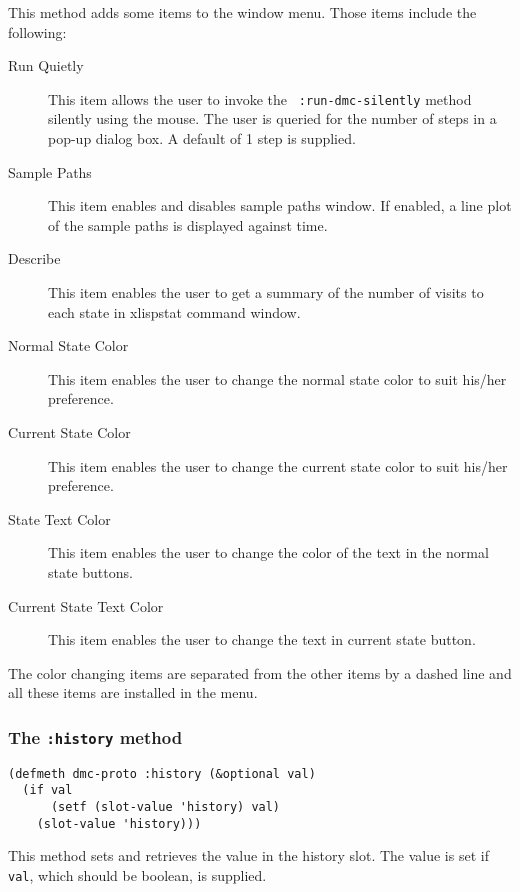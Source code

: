 This method adds some items to the window menu.  Those items include
the following:
\begin{description}
\item[Run Quietly] This item allows the user to invoke the {\tt
    :run-dmc-silently} method silently using the mouse. The user is
  queried for the number of steps in a pop-up dialog box. A default of
  1 step is supplied. 
\item[Sample Paths]  This item enables and disables sample paths
  window. If enabled, a line plot of the sample paths is displayed
  against time. 
\item[Describe]  This item enables the user to get a summary of the
  number of visits to each state in xlispstat command window.
\item[Normal State Color] This item enables the user to change the
  normal state color to suit his/her preference.
\item[Current State Color]  This item enables the user to change the
  current state color to suit his/her preference.
\item[State Text Color]  This item enables the user to change the
  color of the text in the normal state buttons.
\item[Current State Text Color]  This item enables the user to change
  the text in current state button.
\end{description}
The color changing items are separated from the other items by a
dashed line and all these items are installed in the menu.

\subsubsection{The {\tt :history} method}
\label{subsubsec:history}
\begin{verbatim}
(defmeth dmc-proto :history (&optional val)
  (if val 
      (setf (slot-value 'history) val)
    (slot-value 'history)))
\end{verbatim}
This method sets and retrieves the value in the history slot. The
value is set if {\tt val}, which should be boolean, is supplied.

